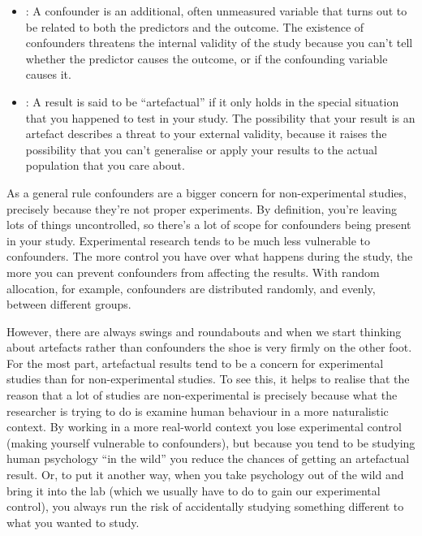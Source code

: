 \begin{itemize}
\item {}: A confounder is an additional, often unmeasured variable that turns out to be related to both the predictors and the outcome. The existence of confounders threatens the internal validity of the study because you can't tell whether the predictor causes the outcome, or if the confounding variable causes it.
\item {}: A result is said to be ``artefactual'' if it only holds in the special situation that you happened to test in your study. The possibility that your result is an artefact describes a threat to your external validity, because it raises the possibility that you can't generalise or apply your results to the actual population that you care about.
\end{itemize}

As a general rule confounders are a bigger concern for non-experimental studies, precisely because they're not proper experiments. By definition, you're leaving lots of things uncontrolled, so there's a lot of scope for confounders being present in your study. Experimental research tends to be much less vulnerable to confounders. The more control you have over what happens during the study, the more you can prevent confounders from affecting the results. With random allocation, for example, confounders are distributed randomly, and evenly, between different groups.

However, there are always swings and roundabouts and when we start thinking about artefacts rather than confounders the shoe is very firmly on the other foot. For the most part, artefactual results tend to be a concern for experimental studies than for non-experimental studies. To see this, it helps to realise that the reason that a lot of studies are non-experimental is precisely because what the researcher is trying to do is examine human behaviour in a more naturalistic context. By working in a more real-world context you lose experimental control (making yourself vulnerable to confounders), but because you tend to be studying human psychology ``in the wild'' you reduce the chances of getting an artefactual result. Or, to put it another way, when you take psychology out of the wild and bring it into the lab (which we usually have to do to gain our experimental control), you always run the risk of accidentally studying something different to what you wanted to study. 

